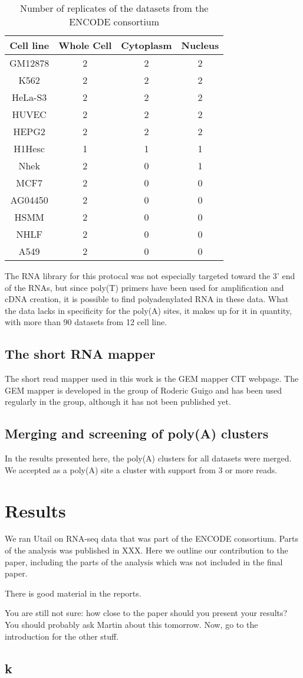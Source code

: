 \begin{table}
	\centering
	\begin{tabular}{cccc}
	  Cell line & Whole Cell & Cytoplasm & Nucleus \\
	  \midrule
	  GM12878 & 2 & 2 & 2 \\
	  K562 & 2 & 2 & 2 \\
	  HeLa-S3 & 2 & 2 & 2 \\
	  HUVEC & 2 & 2 & 2 \\
	  HEPG2 & 2 & 2 & 2 \\
	  H1Hesc & 1 & 1 & 1 \\
	  Nhek & 2 & 0 & 1 \\
	  MCF7 & 2 & 0 & 0 \\
	  AG04450 & 2 & 0 & 0 \\
	  HSMM & 2 & 0 & 0 \\
	  NHLF & 2 & 0 & 0 \\
	  A549 & 2 & 0 & 0 \\
	\end{tabular}
	\caption{Number of replicates of the datasets from the ENCODE consortium}
	\label{tab:Datasets}
\end{table}

The RNA library for this protocal was not especially targeted toward the 3' end
of the RNAs, but since poly(T) primers have been used for amplification and
cDNA creation, it is possible to find polyadenylated RNA in these data. What
the data lacks in specificity for the poly(A) sites, it makes up for it in
quantity, with more than 90 datasets from 12 cell line.

\subsection{The short RNA mapper}
The short read mapper used in this work is the GEM mapper CIT webpage. The GEM
mapper is developed in the group of Roderic Guigo and has been used regularly
in the group, although it has not been published yet.

\subsection{Merging and screening of poly(A) clusters}
In the results presented here, the poly(A) clusters for all datasets were
merged. We accepted as a poly(A) site a cluster with support from 3 or more
reads.

\section{Results}
We ran Utail on RNA-seq data that was part of the ENCODE consortium. Parts of
the analysis was published in XXX. Here we outline our contribution to the
paper, including the parts of the analysis which was not included in the final
paper.

There is good material in the reports.

You are still not sure: how close to the paper should you present your results?
You should probably ask Martin about this tomorrow. Now, go to the introduction
for the other stuff.

\subsection{k}
